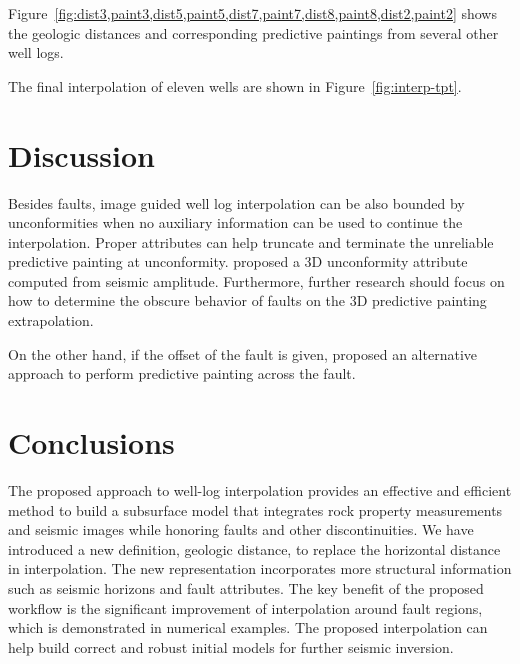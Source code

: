 Figure~\ref{fig:dist3,paint3,dist5,paint5,dist7,paint7,dist8,paint8,dist2,paint2} shows the geologic distances and corresponding predictive paintings from several other well logs.


The final interpolation of eleven wells are shown in Figure~\ref{fig:interp-tpt}.



\section{Discussion}
Besides faults, image guided well log interpolation can be also bounded by unconformities when no auxiliary information can be used to continue the interpolation.
Proper attributes can help truncate and terminate the unreliable predictive painting at unconformity.
\cite{wu2015} proposed a 3D unconformity attribute computed from seismic amplitude.
Furthermore, further research should focus on how to determine the obscure behavior of faults on the 3D predictive painting extrapolation.

On the other hand, if the offset of the fault is given, \cite{xue17} proposed an alternative approach to perform predictive painting across the fault.


\section{Conclusions}
The proposed approach to well-log interpolation provides an effective and efficient method to build a subsurface model that integrates rock property measurements and seismic images while honoring faults and other discontinuities.
We have introduced a new definition, geologic distance, to replace the horizontal distance in interpolation.
The new representation incorporates more structural information such as seismic horizons and fault attributes.
The key benefit of the proposed workflow is the significant improvement of interpolation around fault regions, which is demonstrated in numerical examples.
The proposed interpolation can help build correct and robust initial models for further seismic inversion.


